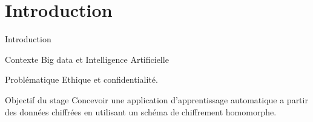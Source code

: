 \documentclass{beamer}
\begin{document}
  

\section{Introduction}



\begin{frame}{Introduction}
\begin{block}{Contexte}
Big data et Intelligence Artificielle
\end{block}


\begin{block}{Problématique}
Ethique et confidentialité.
\end{block}


\begin{block}{Objectif du stage}
Concevoir une application d'apprentissage automatique a partir des données chiffrées en utilisant un schéma de chiffrement homomorphe.
\end{block}
\end{frame}
\end{document}
